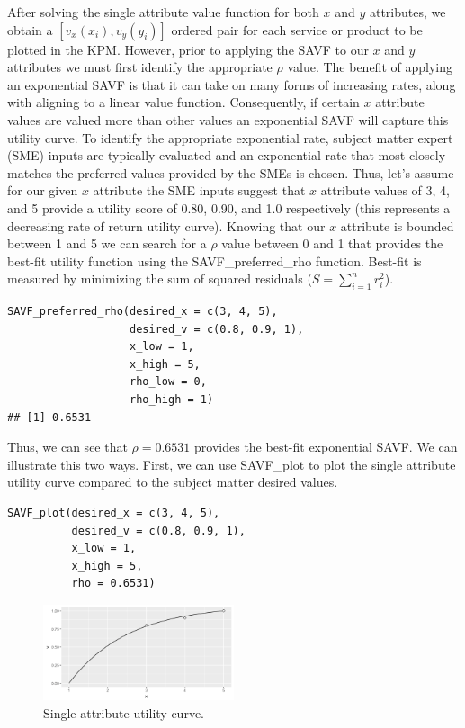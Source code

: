 \documentclass[twocolumn]{svjour3}       %
\begin{document}
After solving the single attribute value function for both $x$ and $y$ attributes, we obtain a $\left[v_x\left(x_i\right), v_y\left(y_i\right)\right]$ ordered pair for each service or product to be plotted in the KPM.  However, prior to applying the SAVF to our $x$ and $y$ attributes we must first identify the appropriate $\rho$ value. The benefit of applying an exponential SAVF is that it can take on many forms of increasing rates, along with aligning to a linear value function. Consequently, if certain $x$ attribute values are valued more than other values an exponential SAVF will capture this utility curve. To identify the appropriate exponential rate, subject matter expert (SME) inputs are typically evaluated and an exponential rate that most closely matches the preferred values provided by the SMEs is chosen. Thus, let's assume for our given $x$ attribute the SME inputs suggest that $x$ attribute values of 3, 4, and 5 provide a utility score of 0.80, 0.90, and 1.0 respectively (this represents a decreasing rate of return utility curve). Knowing that our $x$ attribute is bounded between 1 and 5 we can search for a $\rho$ value between 0 and 1 that provides the best-fit utility function using the SAVF\_preferred\_rho function.  Best-fit is measured by minimizing the sum of squared residuals ($S = \sum_{i = 1}^n r_i ^ 2$).
\begin{verbatim}
SAVF_preferred_rho(desired_x = c(3, 4, 5),
                   desired_v = c(0.8, 0.9, 1),
                   x_low = 1,
                   x_high = 5,
                   rho_low = 0,
                   rho_high = 1)
## [1] 0.6531
\end{verbatim}

Thus, we can see that $\rho = 0.6531$ provides the best-fit exponential SAVF. We can illustrate this two ways. First, we can use SAVF\_plot to plot the single attribute utility curve compared to the subject matter desired values.
\begin{verbatim}
SAVF_plot(desired_x = c(3, 4, 5),
          desired_v = c(0.8, 0.9, 1),
          x_low = 1,
          x_high = 5,
          rho = 0.6531)
\end{verbatim}

\begin{figure}[!htb]
  \includegraphics[width=0.5\textwidth]{fig3.png}
  \caption{Single attribute utility curve.}
  \label{fig:3}
\end{figure}
\end{document}
